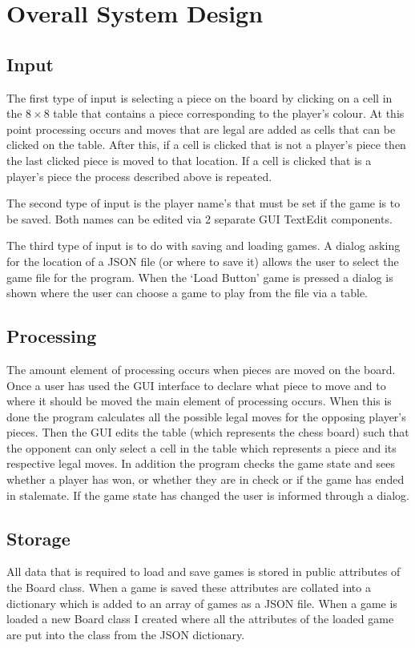 \section{Overall System Design}
\subsection{Input}
The first type of input is selecting a piece on the board by clicking on a cell in the $ 8\times8 $ table that contains a piece corresponding to the player's colour. At this point processing occurs and moves that are legal are added as cells that can be clicked on the table. After this, if a cell is clicked that is not a player's piece then the last clicked piece is moved to that location. If a cell is clicked that is a player's piece the process described above is repeated.

The second type of input is the player name's that must be set if the game is to be saved. Both names can be edited via 2 separate GUI TextEdit components. 

The third type of input is to do with saving and loading games. A dialog asking for the location of a JSON file (or where to save it) allows the user to select the game file for the program. When the ‘Load Button' game is pressed a dialog is shown where the user can choose a game to play from the file via a table.
\subsection{Processing}
The amount element of processing occurs when pieces are moved on the board. Once a user has used the GUI interface to declare what piece to move and to where it should be moved the main element of processing occurs. When this is done the program calculates all the possible legal moves for the opposing player's pieces. Then the GUI edits the table (which represents the chess board) such that the opponent can only select a cell in the table which represents a piece and its respective legal moves. In addition the program checks the game state and sees whether a player has won, or whether they are in check or if the game has ended in stalemate. If the game state has changed the user is informed through a dialog. 
\subsection{Storage}
All data that is required to load and save games is stored in public attributes of the Board class. When a game is saved these attributes are collated into a dictionary which is added to an array of games as a JSON file. When a game is loaded a new Board class I created where all the attributes of the loaded game are put into the class from the JSON dictionary.
